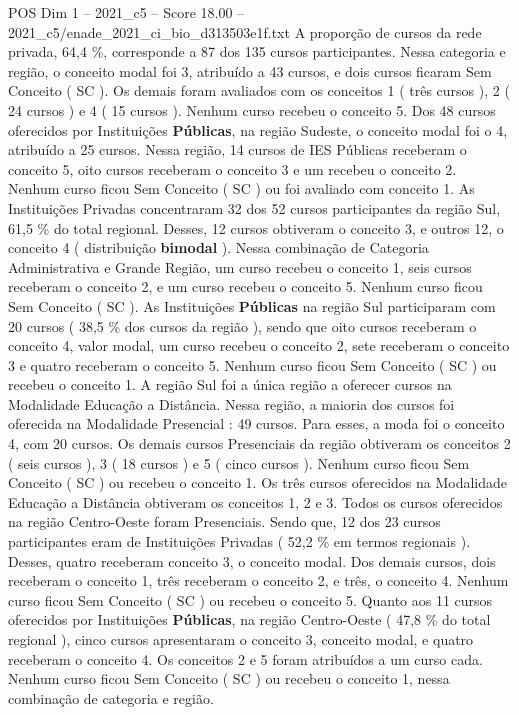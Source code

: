 \begin{textsample}{POS Dim 1 – 2021\_c5 – Score 18.00 – 2021\_c5/enade\_2021\_ci\_bio\_d313503e1f.txt}
A proporção de cursos da rede privada, 64,4 \%, corresponde a 87 dos 135 cursos participantes.
Nessa categoria e região, o conceito modal foi 3, atribuído a 43 cursos, e dois cursos ficaram Sem Conceito ( SC ).
Os demais foram avaliados com os conceitos 1 ( três cursos ), 2 ( 24 cursos ) e 4 ( 15 cursos ).
Nenhum curso recebeu o conceito 5.
Dos 48 cursos oferecidos por Instituições \textbf{Públicas}, na região Sudeste, o conceito modal foi o 4, atribuído a 25 cursos.
Nessa região, 14 cursos de IES Públicas receberam o conceito 5, oito cursos receberam o conceito 3 e um recebeu o conceito 2.
Nenhum curso ficou Sem Conceito ( SC ) ou foi avaliado com conceito 1.
As Instituições Privadas concentraram 32 dos 52 cursos participantes da região Sul, 61,5 \% do total regional.
Desses, 12 cursos obtiveram o conceito 3, e outros 12, o conceito 4 ( distribuição \textbf{bimodal} ).
Nessa combinação de Categoria Administrativa e Grande Região, um curso recebeu o conceito 1, seis cursos receberam o conceito 2, e um curso recebeu o conceito 5.
Nenhum curso ficou Sem Conceito ( SC ).
As Instituições \textbf{Públicas} na região Sul participaram com 20 cursos ( 38,5 \% dos cursos da região ), sendo que oito cursos receberam o conceito 4, valor modal, um curso recebeu o conceito 2, sete receberam o conceito 3 e quatro receberam o conceito 5.
Nenhum curso ficou Sem Conceito ( SC ) ou recebeu o conceito 1.
A região Sul foi a única região a oferecer cursos na Modalidade Educação a Distância.
Nessa região, a maioria dos cursos foi oferecida na Modalidade Presencial : 49 cursos.
Para esses, a moda foi o conceito 4, com 20 cursos.
Os demais cursos Presenciais da região obtiveram os conceitos 2 ( seis cursos ), 3 ( 18 cursos ) e 5 ( cinco cursos ).
Nenhum curso ficou Sem Conceito ( SC ) ou recebeu o conceito 1.
Os três cursos oferecidos na Modalidade Educação a Distância obtiveram os conceitos 1, 2 e 3.
Todos os cursos oferecidos na região Centro-Oeste foram Presenciais.
Sendo que, 12 dos 23 cursos participantes eram de Instituições Privadas ( 52,2 \% em termos regionais ).
Desses, quatro receberam conceito 3, o conceito modal.
Dos demais cursos, dois receberam o conceito 1, três receberam o conceito 2, e três, o conceito 4.
Nenhum curso ficou Sem Conceito ( SC ) ou recebeu o conceito 5.
Quanto aos 11 cursos oferecidos por Instituições \textbf{Públicas}, na região Centro-Oeste ( 47,8 \% do total regional ), cinco cursos apresentaram o conceito 3, conceito modal, e quatro receberam o conceito 4.
Os conceitos 2 e 5 foram atribuídos a um curso cada.
Nenhum curso ficou Sem Conceito ( SC ) ou recebeu o conceito 1, nessa combinação de categoria e região.

\end{textsample}

